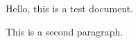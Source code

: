 \documentclass{article}
\begin{document}
Hello, this is a test document.

This is a second paragraph.
\end{document}
